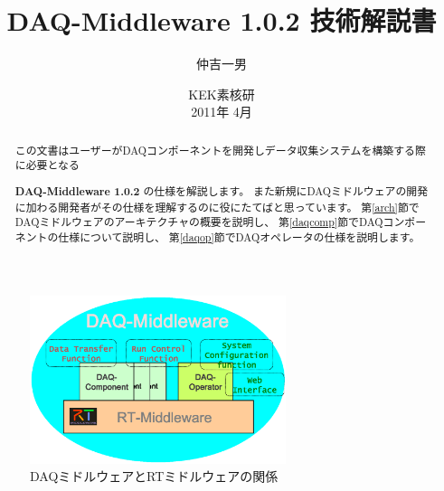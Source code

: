 \documentclass[a4j,10pt,dvips,onecolumn,oneside,final]{jarticle}%
\newcommand {\daqmwcurrent} {
	{\bf DAQ-Middleware 1.0.2}
}
\begin{document}
\title{ \daqmwcurrent 技術解説書\\
}
\author{仲吉一男}
\date{
\vspace{0.1cm}
  KEK素核研\\
\vspace{0.4cm}
  2011年 4月 
}
\maketitle
\begin{abstract}
この文書はユーザーがDAQコンポーネントを開発しデータ収集システムを構築する際に必要となる
\daqmwcurrent の仕様を解説します。
また新規にDAQミドルウェアの開発に加わる開発者がその仕様を理解するのに役にたてばと思っています。
第\ref{arch}節でDAQミドルウェアのアーキテクチャの概要を説明し、
第\ref{daqcomp}節でDAQコンポーネントの仕様について説明し、
第\ref{daqop}節でDAQオペレータの仕様を説明します。

\end{abstract}
{\rm }
\tableofcontents
\newpage

\begin{figure}
  \begin{center}
   \includegraphics[width=75mm]{daqmw-rtmw.eps}
  \end{center}
  \vspace{-7mm}
  \caption{\footnotesize DAQミドルウェアとRTミドルウェアの関係}
  \label{daqmw.fig}
\end{figure}
\end{document}
